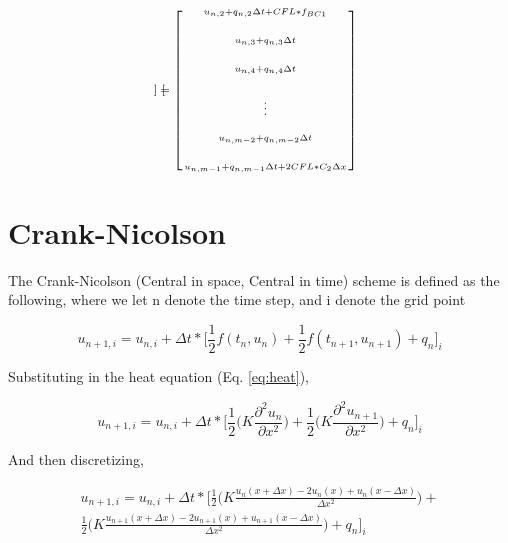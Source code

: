 \documentclass[10pt, letter, showtrims]{extarticle}
\begin{document}
\begin{fleqn}
\begin{equation}
\begin{medsize}
\begin{bmatrix}
					\end{bmatrix}
					=
					\begin{bmatrix}
						\begin{smallmatrix}
							u_{n, 2} + q_{n, 2} \Delta t + CFL * f_{BC1}             \\[1.5em]
							u_{n, 3} + q_{n, 3} \Delta t                             \\[1.5em]
							u_{n, 4} + q_{n, 4} \Delta t                             \\[1.5em]
							\vdots                                                   \\[1.5em]
							u_{n, m-2} + q_{n, m-2} \Delta t                         \\[1.5em]
							u_{n, m-1} + q_{n, m-1} \Delta t + 2CFL * C_{2} \Delta x
						\end{smallmatrix}
					\end{bmatrix}
				\end{medsize}
			\end{equation} 
		\end{fleqn}   		
    		
		\pagebreak
		
		\noindent
		\section{Crank-Nicolson}
		
		\noindent
		The Crank-Nicolson (Central in space, Central in time) scheme is defined as the following, where we let n denote the time step, and i denote the grid point
		
		\begin{equation}
			u_{n+1,i} = u_{n,i} + \Delta t * \Big[ \frac{1}{2} f(t_{n}, u_{n}) + \frac{1}{2} f(t_{n+1}, u_{n+1}) + q_{n} \Big]_{i}
		\end{equation}
		
		\noindent
		Substituting in the heat equation (Eq. \ref{eq:heat}),
		
		\begin{equation}
			u_{n+1,i} = u_{n,i} + \Delta t * \Big[ \frac{1}{2} \big( K \frac{\partial^{2} u_{n}}{\partial x^{2}} \big) + \frac{1}{2} \big( K \frac{\partial^{2} u_{n+1}}{\partial x^{2}} \big) + q_{n} \Big]_{i}
		\end{equation}
		
		\noindent
		And then discretizing,
		
		\begin{equation}
		\label{eq:cn}
			\begin{split}
			u_{n+1,i} = u_{n,i} + \Delta t * \Big[ \frac{1}{2} \big( K \frac{u_{n}(x + \Delta x) - 2 u_{n}(x) + u_{n}(x - \Delta x)}{\Delta x^{2}} \big) + \\
			 \frac{1}{2} \big( K \frac{u_{n+1}(x + \Delta x) - 2 u_{n+1}(x) + u_{n+1}(x - \Delta x)}{\Delta x^{2}} \big) + q_{n} \Big]_{i}
			\end{split}
		\end{equation}
		
\end{document}
